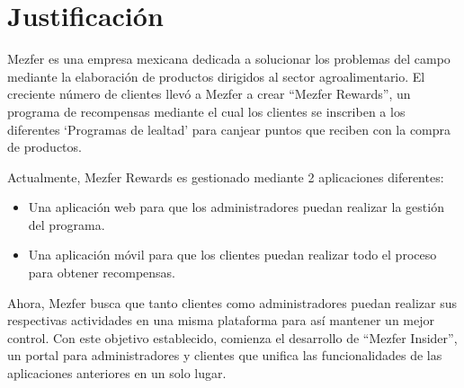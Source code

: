 \chapter{Justificación}
    Mezfer es una empresa mexicana dedicada a solucionar los problemas del campo mediante la elaboración de productos dirigidos al sector agroalimentario. El creciente número de clientes llevó a Mezfer a crear ``Mezfer Rewards'', un programa de recompensas mediante el cual los clientes se inscriben a los diferentes `Programas de lealtad' para canjear puntos que reciben con la compra de productos.
    
    Actualmente, Mezfer Rewards es gestionado mediante 2 aplicaciones diferentes: 
    \begin{itemize}
        \item Una aplicación web para que los administradores puedan realizar la gestión del programa.
        \item Una aplicación móvil para que los clientes puedan realizar todo el proceso para obtener recompensas.
    \end{itemize}

    Ahora, Mezfer busca que tanto clientes como administradores puedan realizar sus respectivas actividades en una misma plataforma para así mantener un mejor control. Con este objetivo establecido, comienza el desarrollo de ``Mezfer Insider'', un portal para administradores y clientes que unifica las funcionalidades de las aplicaciones anteriores en un solo lugar.